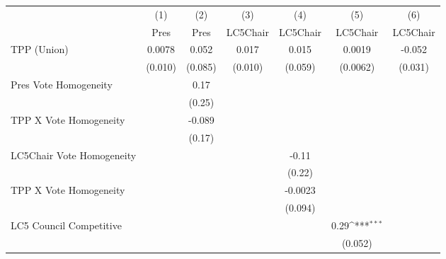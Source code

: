 {
\def\sym#1{\ifmmode^{#1}\else\(^{#1}\)\fi}
\begin{tabular}{l*{6}{c}}
\toprule
                &\multicolumn{1}{c}{(1)}&\multicolumn{1}{c}{(2)}&\multicolumn{1}{c}{(3)}&\multicolumn{1}{c}{(4)}&\multicolumn{1}{c}{(5)}&\multicolumn{1}{c}{(6)}\\
                &\multicolumn{1}{c}{Pres}&\multicolumn{1}{c}{Pres}&\multicolumn{1}{c}{LC5Chair}&\multicolumn{1}{c}{LC5Chair}&\multicolumn{1}{c}{LC5Chair}&\multicolumn{1}{c}{LC5Chair}\\
\midrule
TPP (Union)     &   0.0078         &    0.052         &    0.017         &    0.015         &   0.0019         &   -0.052         \\
                &  (0.010)         &  (0.085)         &  (0.010)         &  (0.059)         & (0.0062)         &  (0.031)         \\
Pres Vote Homogeneity&                  &     0.17         &                  &                  &                  &                  \\
                &                  &   (0.25)         &                  &                  &                  &                  \\
TPP X Vote Homogeneity&                  &   -0.089         &                  &                  &                  &                  \\
                &                  &   (0.17)         &                  &                  &                  &                  \\
LC5Chair Vote Homogeneity&                  &                  &                  &    -0.11         &                  &                  \\
                &                  &                  &                  &   (0.22)         &                  &                  \\
TPP X Vote Homogeneity&                  &                  &                  &  -0.0023         &                  &                  \\
                &                  &                  &                  &  (0.094)         &                  &                  \\
LC5 Council Competitive&                  &                  &                  &                  &     0.29\sym{***}&                  \\
                &                  &                  &                  &                  &  (0.052)         &                  \\

\end{tabular}}
